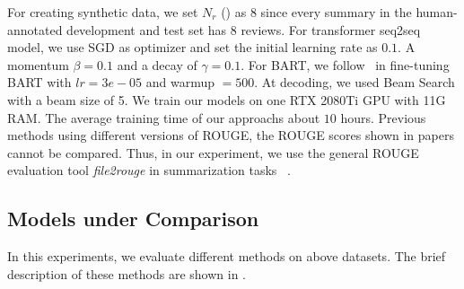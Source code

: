 For creating synthetic data, 
we set $N_r$ () as $8$ 
since every summary in the human-annotated development and test set has $8$ reviews.
For transformer seq2seq model, we use SGD as optimizer and set the initial learning rate as $0.1$.
A momentum $\beta=0.1$ and a decay of  $\gamma=0.1$.
For BART,
we follow~\citet{BART20} in fine-tuning BART with
$lr=3e-05$ and warmup $=500$.
At decoding, we used Beam Search with a beam size of 5.
We train our models on one RTX 2080Ti GPU with 11G RAM. 
The average training time of our approachs about $10$ hours.
Previous methods using different versions of ROUGE,
the ROUGE scores shown in papers cannot be compared.
Thus, in our experiment, we use the general ROUGE evaluation tool {\em file2rouge} in summarization tasks
~\cite{BART20,DialogMV2020}.




\subsection{Models under Comparison}
In this experiments, we evaluate different methods on above datasets.
The brief description of these methods are shown in .



